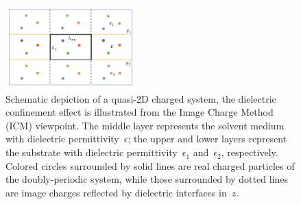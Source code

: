\documentclass[aps,prl,reprint,showpacs,floatfix,superscriptaddress]{revtex4-2}
\newcommand{\V}[1]{\boldsymbol{#1}} %
\newcommand{\M}[1]{\boldsymbol{#1}} %
\renewcommand{\d}[1]{\delta#1} %
\newcommand{\norm}[1]{\left\Vert #1\right\Vert } %
\newcommand{\grad}{\M{\nabla}} %
\newcommand{\eps}{\epsilon}
\begin{document}
\begin{figure}[htbp]
	\centering
	\includegraphics[width=0.45\textwidth]{figs/fig1.pdf}
	\caption{
		Schematic depiction of a quasi-2D charged system, the dielectric confinement effect is illustrated from the Image Charge Method (ICM) viewpoint. The middle layer represents the solvent medium with dielectric permittivity~$\epsilon$; the upper and lower layers represent the substrate with dielectric permittivity~$\epsilon_1$ and~$\eps_2$, respectively. Colored circles surrounded by solid lines are real charged particles of the doubly-periodic system, while those surrounded by dotted lines are image charges reflected by dielectric interfaces in~$z$.
		\label{fig:ICM}
	}
\end{figure}
\end{document}
